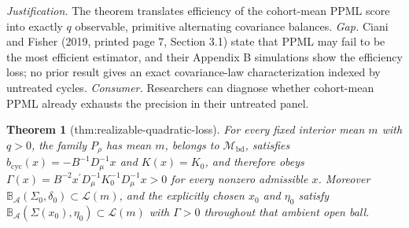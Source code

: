 \documentclass{article}
\newtheorem{theorem}{Theorem}
\begin{document}
\par\smallskip\noindent \textit{Justification.} The theorem translates efficiency of the cohort-mean PPML score into exactly \(q\) observable, primitive alternating covariance balances. \textit{Gap.} Ciani and Fisher (2019, printed page 7, Section 3.1) state that PPML may fail to be the most efficient estimator, and their Appendix B simulations show the efficiency loss; no prior result gives an exact covariance-law characterization indexed by untreated cycles. \textit{Consumer.} Researchers can diagnose whether cohort-mean PPML already exhausts the precision in their untreated panel.

\begin{theorem}[thm:realizable-quadratic-loss]\label{thm:realizable-quadratic-loss}
For every fixed interior mean \(m\) with \(q>0\), the family \(P_{\rho}\) has mean \(m\), belongs to \(\mathcal M_{\mathrm{bd}}\), satisfies \(b_{\mathrm{cyc}}(x)=-B^{-1}D_{\mu}^{-1}x\) and \(K(x)=K_0\), and therefore obeys \(\Gamma(x)=B^{-2}x^{\prime}D_{\mu}^{-1}K_0^{-1}D_{\mu}^{-1}x>0\) for every nonzero admissible \(x\). Moreover \(\mathbb B_{\mathcal A}(\Sigma_0,\delta_0)\subset\mathcal L(m)\), and the explicitly chosen \(x_0\) and \(\eta_0\) satisfy \(\mathbb B_{\mathcal A}(\Sigma(x_0),\eta_0)\subset\mathcal L(m)\) with \(\Gamma>0\) throughout that ambient open ball.
\end{theorem}
\end{document}
